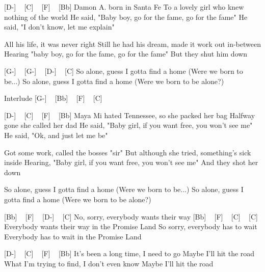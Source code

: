 [D-] ~ [C] ~ [F] ~ [Bb]
Damon A. born in Santa Fe
To a lovely girl who knew nothing of the world
He said, "Baby boy, go for the fame, go for the fame"
He said, "I don't know, let me explain"


All his life, it was never right
Still he had his dream, made it work out in-between
Hearing "baby boy, go for the fame, go for the fame"
But they shut him down

[G-] ~ [G-] ~ [D-] ~ [C]
So alone, guess I gotta find a home
(Were we born to be...)
So alone, guess I gotta find a home
(Were we born to be alone?)

Interlude
[G-] ~ [Bb] ~ [F] ~ [C]

[D-] ~ [C] ~ [F] ~ [Bb]
Maya Mi hated Tennessee, so she packed her bag
Halfway gone she called her dad
He said, "Baby girl, if you want free, you won't see me"
He said, "Ok, and just let me be"

Got some work, called the bosses "sir"
But although she tried, something's sick inside
Hearing, "Baby girl, if you want free, you won't see me"
And they shot her down

So alone, guess I gotta find a home
(Were we born to be...)
So alone, guess I gotta find a home
(Were we born to be alone?)

[Bb] ~ [F] ~ [D-] ~ [C]
No, sorry, everybody wants their way
[Bb] ~ [F] ~ [C] ~ [C]
Everybody wants their way in the Promise Land
So sorry, everybody has to wait
Everybody has to wait in the Promise Land

[D-] ~ [C] ~ [F] ~ [Bb]
It's been a long time, I need to go
Maybe I'll hit the road
What I'm trying to find, I don't even know
Maybe I'll hit the road

